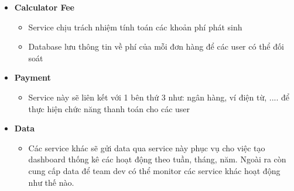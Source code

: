 \begin{itemize}
			\item \textbf{Calculator Fee}
			\begin{itemize}
				\item Service chịu trách nhiệm tính toán các khoản phí phát sinh
				\item Database lưu thông tin về phí của mỗi đơn hàng để các user có thể đối soát
			\end{itemize}
			\item \textbf{Payment}
			\begin{itemize}
				\item Service này sẽ liên kết với 1 bên thứ 3 như: ngân hàng, ví điện từ, .... để thực hiện chức năng thanh toán cho các user
			\end{itemize}
			\item \textbf{Data}
			\begin{itemize}
				\item Các service khác sẽ gửi data qua service này phục vụ cho việc tạo dashboard thống kê các hoạt động theo tuần, tháng, năm. Ngoài ra còn cung cấp data để team dev có thể monitor các service khác hoạt động như thế nào.
			\end{itemize}
		\end{itemize}
		\newpage
